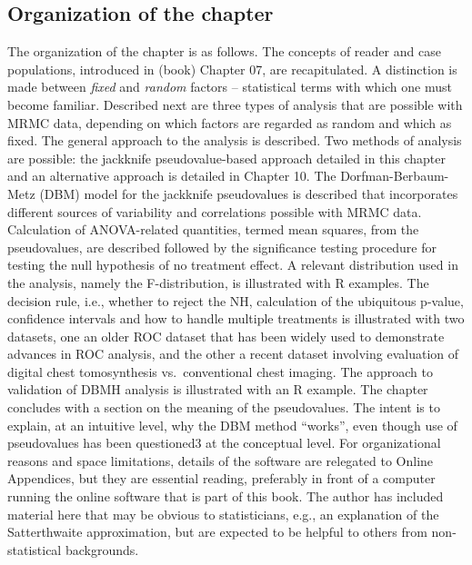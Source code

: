\documentclass[
]{book}
\begin{document}
\hypertarget{organization-of-the-chapter}{%
\subsection{Organization of the chapter}\label{organization-of-the-chapter}}

The organization of the chapter is as follows. The concepts of reader and case populations, introduced in (book) Chapter 07, are recapitulated. A distinction is made between \emph{fixed} and \emph{random} factors -- statistical terms with which one must become familiar. Described next are three types of analysis that are possible with MRMC data, depending on which factors are regarded as random and which as fixed. The general approach to the analysis is described. Two methods of analysis are possible: the jackknife pseudovalue-based approach detailed in this chapter and an alternative approach is detailed in Chapter 10. The Dorfman-Berbaum-Metz (DBM) model for the jackknife pseudovalues is described that incorporates different sources of variability and correlations possible with MRMC data. Calculation of ANOVA-related quantities, termed mean squares, from the pseudovalues, are described followed by the significance testing procedure for testing the null hypothesis of no treatment effect. A relevant distribution used in the analysis, namely the F-distribution, is illustrated with R examples. The decision rule, i.e., whether to reject the NH, calculation of the ubiquitous p-value, confidence intervals and how to handle multiple treatments is illustrated with two datasets, one an older ROC dataset that has been widely used to demonstrate advances in ROC analysis, and the other a recent dataset involving evaluation of digital chest tomosynthesis vs.~conventional chest imaging. The approach to validation of DBMH analysis is illustrated with an R example. The chapter concludes with a section on the meaning of the pseudovalues. The intent is to explain, at an intuitive level, why the DBM method ``works'', even though use of pseudovalues has been questioned3 at the conceptual level. For organizational reasons and space limitations, details of the software are relegated to Online Appendices, but they are essential reading, preferably in front of a computer running the online software that is part of this book. The author has included material here that may be obvious to statisticians, e.g., an explanation of the Satterthwaite approximation, but are expected to be helpful to others from non-statistical backgrounds.
\end{document}
